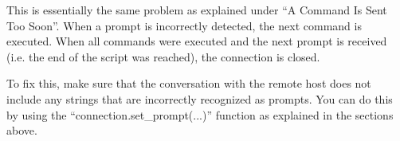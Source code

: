 This is essentially the same problem as explained under ``A Command Is Sent 
Too Soon''. When a prompt is incorrectly detected, the next command is 
executed. When all commands were executed and the next prompt is received 
(i.e. the end of the script was reached), the connection is closed.

To fix this, make sure that the conversation with the remote host does 
not include any strings that are incorrectly recognized as prompts. You can 
do this by using the ``connection.set\_prompt(...)'' function as explained 
in the sections above. 

